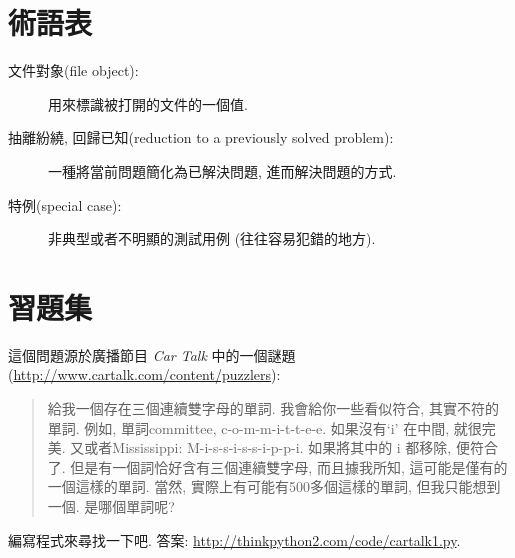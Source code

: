 \documentclass[10pt]{book}
\begin{document}
\section{術語表}

\begin{description}

\item[文件對象(file object):] 用來標識被打開的文件的一個值.

\item[抽離紛繞, 回歸已知(reduction to a previously solved problem):] 一種將當前問題簡化為已解決問題, 進而解決問題的方式.

\item[特例(special case):] 非典型或者不明顯的測試用例
(往往容易犯錯的地方).

\end{description}


\section{習題集}

\begin{exercise}

這個問題源於廣播節目 {\em Car Talk} 中的一個謎題
(\url{http://www.cartalk.com/content/puzzlers}):

\begin{quote}
給我一個存在三個連續雙字母的單詞. 
我會給你一些看似符合, 其實不符的單詞. 
例如, 單詞committee,  c-o-m-m-i-t-t-e-e. 
如果沒有`i' 在中間, 就很完美. 
又或者Mississippi: M-i-s-s-i-s-s-i-p-p-i.
如果將其中的 i 都移除, 便符合了. 
但是有一個詞恰好含有三個連續雙字母, 而且據我所知, 
這可能是僅有的一個這樣的單詞. 
當然, 實際上有可能有500多個這樣的單詞, 但我只能想到一個. 
是哪個單詞呢?
\end{quote}

編寫程式來尋找一下吧. 
答案: \url{http://thinkpython2.com/code/cartalk1.py}.

\end{exercise}
\end{document}
